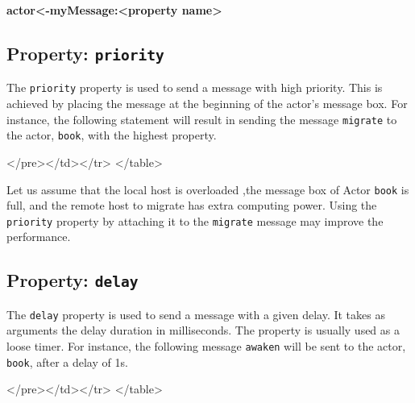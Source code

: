 \textbf{actor{\textless}-myMessage:{\textless}property name{\textgreater}}


\subsection{Property: {\tt priority}}
The {\tt priority} property is used to send a message with high priority.
This is achieved by placing the message at the beginning 
of the actor's message box.
For instance, the following statement will result in sending the 
message {\tt migrate} to the actor, {\tt book}, with the 
highest property. 
{\singlespace

}
\begin{htmlonly}

 \begin{rawhtml} 
   </pre></td></tr>
  </table>
\end{rawhtml} 
\end{htmlonly}

Let us assume that the local host is overloaded ,the message box of Actor {\tt book} is full, and
the remote host to migrate has extra computing power. 
Using the {\tt priority} property by attaching it to the {\tt migrate} message may improve the performance.

\subsection{Property: {\tt delay}}
The {\tt delay} property is used to send a message with a given delay. 
It takes as arguments the delay duration in milliseconds. 
The property is usually used as a loose timer.
For instance,
the following message {\tt awaken} will be sent to the 
actor, {\tt book}, after a delay of 1s.
{\singlespace

}
\begin{htmlonly}

 \begin{rawhtml} 
   </pre></td></tr>
  </table>
\end{rawhtml} 
\end{htmlonly}

